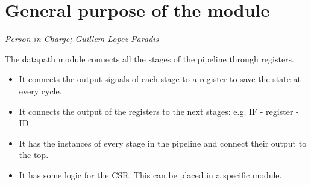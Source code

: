 \newpage
\section{General purpose of the module}
\textit{Person in Charge; Guillem Lopez Paradis}

The datapath module connects all the stages of the pipeline through registers.
\begin{itemize}
	\item It connects the output signals of each stage to a register to save the state at every cycle.
	\item It connects the output of the registers to the next stages: e.g. IF - register - ID
	\item It has the instances of every stage in the pipeline and connect their output to the top.
	\item It has some logic for the CSR. This can be placed in a specific module.
\end{itemize} 

